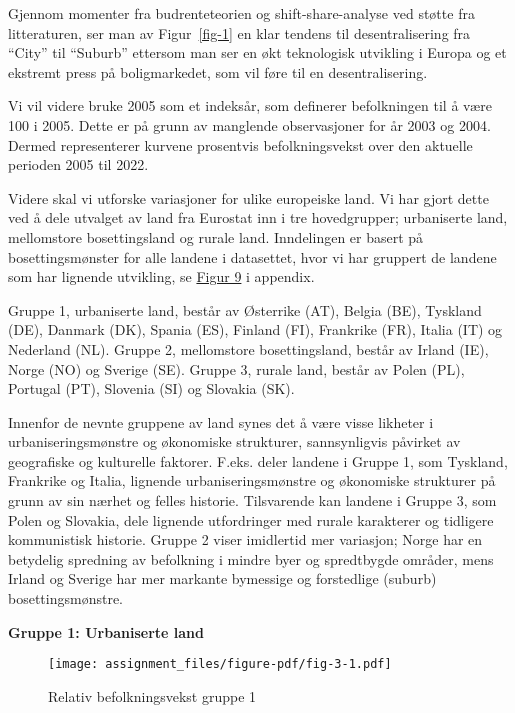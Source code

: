 \documentclass[
  letterpaper,
  DIV=11,
  numbers=noendperiod]{scrartcl}
\begin{document}
Gjennom momenter fra budrenteteorien og shift-share-analyse ved støtte
fra litteraturen, ser man av Figur~\ref{fig-1} en klar tendens til
desentralisering fra ``City'' til ``Suburb'' ettersom man ser en økt
teknologisk utvikling i Europa og et ekstremt press på boligmarkedet,
som vil føre til en desentralisering.

Vi vil videre bruke 2005 som et indeksår, som definerer befolkningen til
å være 100 i 2005. Dette er på grunn av manglende observasjoner for år
2003 og 2004. Dermed representerer kurvene prosentvis befolkningsvekst
over den aktuelle perioden 2005 til 2022.

Videre skal vi utforske variasjoner for ulike europeiske land. Vi har
gjort dette ved å dele utvalget av land fra Eurostat inn i tre
hovedgrupper; urbaniserte land, mellomstore bosettingsland og rurale
land. Inndelingen er basert på bosettingsmønster for alle landene i
datasettet, hvor vi har gruppert de landene som har lignende utvikling,
se \protect\hyperlink{fig-9}{Figur 9} i appendix.

Gruppe 1, urbaniserte land, består av Østerrike (AT), Belgia (BE),
Tyskland (DE), Danmark (DK), Spania (ES), Finland (FI), Frankrike (FR),
Italia (IT) og Nederland (NL). Gruppe 2, mellomstore bosettingsland,
består av Irland (IE), Norge (NO) og Sverige (SE). Gruppe 3, rurale
land, består av Polen (PL), Portugal (PT), Slovenia (SI) og Slovakia
(SK).

Innenfor de nevnte gruppene av land synes det å være visse likheter i
urbaniseringsmønstre og økonomiske strukturer, sannsynligvis påvirket av
geografiske og kulturelle faktorer. F.eks. deler landene i Gruppe 1, som
Tyskland, Frankrike og Italia, lignende urbaniseringsmønstre og
økonomiske strukturer på grunn av sin nærhet og felles historie.
Tilsvarende kan landene i Gruppe 3, som Polen og Slovakia, dele lignende
utfordringer med rurale karakterer og tidligere kommunistisk historie.
Gruppe 2 viser imidlertid mer variasjon; Norge har en betydelig
spredning av befolkning i mindre byer og spredtbygde områder, mens
Irland og Sverige har mer markante bymessige og forstedlige (suburb)
bosettingsmønstre.

\textbf{Gruppe 1: Urbaniserte land}

\begin{figure}

{\centering \texttt{[image: assignment\_files/figure-pdf/fig-3-1.pdf]}

}

\caption{\label{fig-3}Relativ befolkningsvekst gruppe 1}

\end{figure}
\end{document}
